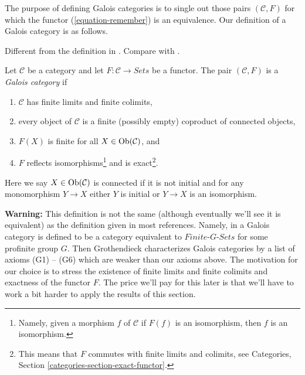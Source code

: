 \noindent
The purpose of defining Galois categories is to single out those
pairs $(\mathcal{C}, F)$ for which the functor (\ref{equation-remember})
is an equivalence. Our definition of a Galois category is as follows.

\begin{definition}
\label{definition-galois-category}
\begin{reference}
Different from the definition in \cite[Expos\'e V, Definition 5.1]{SGA1}.
Compare with \cite[Definition 7.2.1]{BS}.
\end{reference}
Let $\mathcal{C}$ be a category and let $F : \mathcal{C} \to \textit{Sets}$
be a functor. The pair $(\mathcal{C}, F)$ is a {\it Galois category} if
\begin{enumerate}
\item $\mathcal{C}$ has finite limits and finite colimits,
\item
\label{item-connected-components}
every object of $\mathcal{C}$ is a finite (possibly empty)
coproduct of connected objects,
\item $F(X)$ is finite for all $X \in \mathop{\mathrm{Ob}}\nolimits(\mathcal{C})$, and
\item $F$ reflects isomorphisms\footnote{Namely, given a morphism
$f$ of $\mathcal{C}$ if $F(f)$ is an isomorphism, then
$f$ is an isomorphism.} and is exact\footnote{This means that
$F$ commutes with finite limits and colimits, see
Categories, Section \ref{categories-section-exact-functor}.}.
\end{enumerate}
Here we say $X \in \mathop{\mathrm{Ob}}\nolimits(\mathcal{C})$ is connected if
it is not initial and for any monomorphism $Y \to X$
either $Y$ is initial or $Y \to X$ is an isomorphism.
\end{definition}

\noindent
{\bf Warning:} This definition is not the same (although eventually we'll
see it is equivalent) as the definition given in most references.
Namely, in \cite[Expos\'e V, Definition 5.1]{SGA1} a Galois category is
defined to be a category equivalent to $\textit{Finite-}G\textit{-Sets}$
for some profinite group $G$. Then Grothendieck characterizes
Galois categories by a list of axioms (G1) -- (G6) which are weaker
than our axioms above. The motivation for our choice is to stress the
existence of finite limits and finite colimits and exactness of the
functor $F$. The price we'll pay for this later is that we'll have
to work a bit harder to apply the results of this section.

